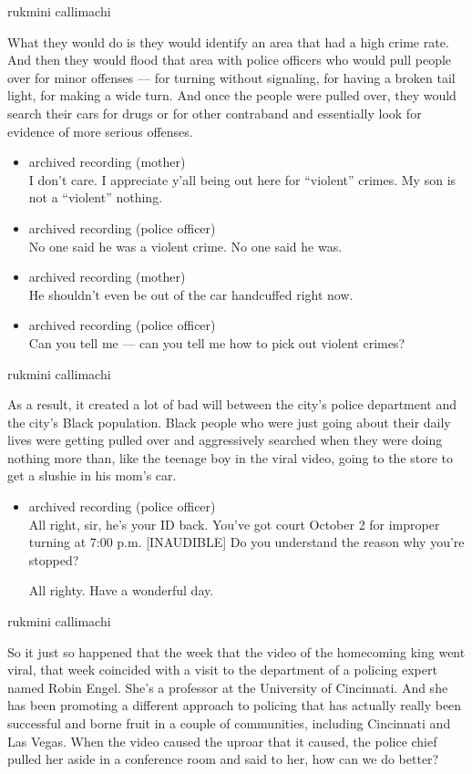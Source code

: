 rukmini callimachi

What they would do is they would identify an area that had a high crime
rate. And then they would flood that area with police officers who would
pull people over for minor offenses --- for turning without signaling,
for having a broken tail light, for making a wide turn. And once the
people were pulled over, they would search their cars for drugs or for
other contraband and essentially look for evidence of more serious
offenses.

\begin{itemize}
\item
  archived recording (mother)\\
  I don't care. I appreciate y'all being out here for ``violent''
  crimes. My son is not a ``violent'' nothing.
\item
  archived recording (police officer)\\
  No one said he was a violent crime. No one said he was.
\item
  archived recording (mother)\\
  He shouldn't even be out of the car handcuffed right now.
\item
  archived recording (police officer)\\
  Can you tell me --- can you tell me how to pick out violent crimes?
\end{itemize}

rukmini callimachi

As a result, it created a lot of bad will between the city's police
department and the city's Black population. Black people who were just
going about their daily lives were getting pulled over and aggressively
searched when they were doing nothing more than, like the teenage boy in
the viral video, going to the store to get a slushie in his mom's car.

\begin{itemize}
\item
  archived recording (police officer)\\
  All right, sir, he's your ID back. You've got court October 2 for
  improper turning at 7:00 p.m. {[}INAUDIBLE{]} Do you understand the
  reason why you're stopped?

  All righty. Have a wonderful day.
\end{itemize}

rukmini callimachi

So it just so happened that the week that the video of the homecoming
king went viral, that week coincided with a visit to the department of a
policing expert named Robin Engel. She's a professor at the University
of Cincinnati. And she has been promoting a different approach to
policing that has actually really been successful and borne fruit in a
couple of communities, including Cincinnati and Las Vegas. When the
video caused the uproar that it caused, the police chief pulled her
aside in a conference room and said to her, how can we do better?

